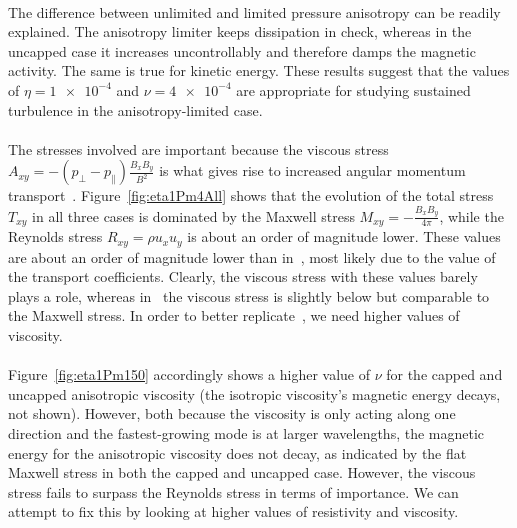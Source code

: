 \\
The difference between unlimited and limited pressure anisotropy can be readily explained. The anisotropy limiter keeps dissipation in check, whereas in the uncapped case it increases uncontrollably and therefore damps the magnetic activity. The same is true for kinetic energy. These results suggest that the values of $\eta=\num{1e-4}$ and $\nu=\num{4e-4}$ are appropriate for studying sustained turbulence in the anisotropy-limited case.\\
\\
The stresses involved are important because the viscous stress $A_{xy}=-(p_\perp-p_\parallel)\frac{B_xB_y}{B^2}$ is what gives rise to increased angular momentum transport~\cite{Kunz2016}. Figure~\ref{fig:eta1Pm4All} shows that the evolution of the total stress $T_{xy}$ in all three cases is dominated by the Maxwell stress $M_{xy}=-\frac{B_xB_y}{4\pi}$, while the Reynolds stress $R_{xy}=\rho u_xu_y$ is about an order of magnitude lower. These values are about an order of magnitude lower than in~, most likely due to the value of the transport coefficients. Clearly, the viscous stress with these values barely plays a role, whereas in~ the viscous stress is slightly below but comparable to the Maxwell stress. In order to better replicate~, we need higher values of viscosity.\\
\\
Figure~\ref{fig:eta1Pm150} accordingly shows a higher value of $\nu$ for the capped and uncapped anisotropic viscosity (the isotropic viscosity's magnetic energy decays, not shown). However, both because the viscosity is only acting along one direction and the fastest-growing mode is at larger wavelengths, the magnetic energy for the anisotropic viscosity does not decay, as indicated by the flat Maxwell stress in both the capped and uncapped case. However, the viscous stress fails to surpass the Reynolds stress in terms of importance. We can attempt to fix this by looking at higher values of resistivity and viscosity.%
